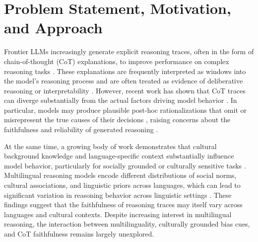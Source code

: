 \section{Problem Statement, Motivation, and Approach}




Frontier LLMs increasingly generate explicit reasoning traces, often in the form of chain-of-thought (CoT) explanations, to improve performance on complex reasoning tasks \citep{wei2022chain,turpin2023language}. These explanations are frequently interpreted as windows into the model’s reasoning process and are often treated as evidence of deliberative reasoning or interpretability \citep{lanham2023measuring}. However, recent work has shown that CoT traces can diverge substantially from the actual factors driving model behavior \citep{turpin2023language, lanham2023measuring, paul2024making}. In particular, models may produce plausible post-hoc rationalizations that omit or misrepresent the true causes of their decisions \citep{chen2025reasoning}, raising concerns about the faithfulness and reliability of generated reasoning \citep{arcuschin2025chainofthought}. 

At the same time, a growing body of work demonstrates that cultural background knowledge and language-specific context substantially influence model behavior, particularly for socially grounded or culturally sensitive tasks \citep{masoud2025cultural,naous2024multicultural,shi2024xcot}. Multilingual reasoning models encode different distributions of social norms, cultural associations, and linguistic priors across languages, which can lead to significant variation in reasoning behavior across linguistic settings \citep{hammerl2022moral, aksoy2024morality}. These findings suggest that the faithfulness of reasoning traces may itself vary across languages and cultural contexts. Despite increasing interest in multilingual reasoning, the interaction between multilinguality, culturally grounded bias cues, and CoT faithfulness remains largely unexplored.

